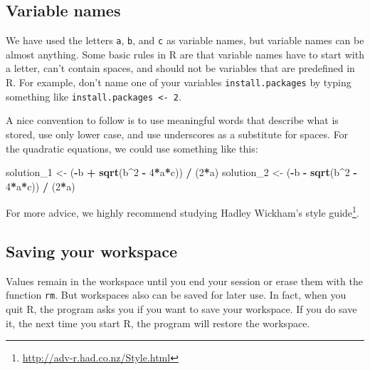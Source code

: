\documentclass[
]{krantz}
\newenvironment{Shaded}{\begin{snugshade}}{\end{snugshade}}
\newcommand{\DecValTok}[1]{\textcolor[rgb]{0.06,0.06,0.06}{#1}}
\newcommand{\KeywordTok}[1]{\textcolor[rgb]{0.27,0.27,0.27}{\textbf{#1}}}
\newcommand{\NormalTok}[1]{#1}
\newcommand{\OperatorTok}[1]{\textcolor[rgb]{0.43,0.43,0.43}{\textbf{#1}}}
\newcommand{\StringTok}[1]{\textcolor[rgb]{0.5,0.5,0.5}{#1}}
\begin{document}
\hypertarget{variable-names}{%
\subsection{Variable names}\label{variable-names}}

We have used the letters \texttt{a}, \texttt{b}, and \texttt{c} as variable names, but variable names can be almost anything. Some basic rules in R are that variable names have to start with a letter, can't contain spaces, and should not be variables that are predefined in R. For example, don't name one of your variables \texttt{install.packages} by typing something like
\texttt{install.packages\ \textless{}-\ 2}.

A nice convention to follow is to use meaningful words that describe what is stored, use only lower case, and use underscores as a substitute for spaces. For the quadratic equations, we could use something like this:

\begin{Shaded}
\begin{Highlighting}[]
\NormalTok{solution_}\DecValTok{1}\NormalTok{ <-}\StringTok{ }\NormalTok{(}\OperatorTok{-}\NormalTok{b }\OperatorTok{+}\StringTok{ }\KeywordTok{sqrt}\NormalTok{(b}\OperatorTok{^}\DecValTok{2} \OperatorTok{-}\StringTok{ }\DecValTok{4}\OperatorTok{*}\NormalTok{a}\OperatorTok{*}\NormalTok{c)) }\OperatorTok{/}\StringTok{ }\NormalTok{(}\DecValTok{2}\OperatorTok{*}\NormalTok{a)}
\NormalTok{solution_}\DecValTok{2}\NormalTok{ <-}\StringTok{ }\NormalTok{(}\OperatorTok{-}\NormalTok{b }\OperatorTok{-}\StringTok{ }\KeywordTok{sqrt}\NormalTok{(b}\OperatorTok{^}\DecValTok{2} \OperatorTok{-}\StringTok{ }\DecValTok{4}\OperatorTok{*}\NormalTok{a}\OperatorTok{*}\NormalTok{c)) }\OperatorTok{/}\StringTok{ }\NormalTok{(}\DecValTok{2}\OperatorTok{*}\NormalTok{a)}
\end{Highlighting}
\end{Shaded}

For more advice, we highly recommend studying Hadley Wickham's style guide\footnote{\url{http://adv-r.had.co.nz/Style.html}}.

\hypertarget{saving-your-workspace}{%
\subsection{Saving your workspace}\label{saving-your-workspace}}

Values remain in the workspace until you end your session or erase them with the function \texttt{rm}. But workspaces also can be saved for later use. In fact, when you quit R, the program asks you if you want to save your workspace. If you do save it, the next time you start R, the program will restore the workspace.
\end{document}
